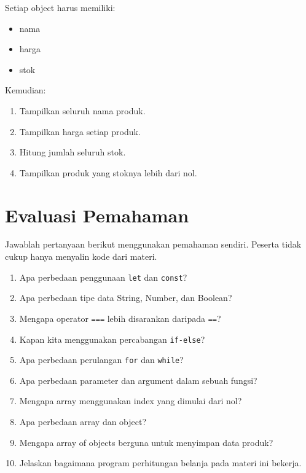 \documentclass[12pt,a4paper]{article}
\begin{document}
Setiap object harus memiliki:

\begin{itemize}
    \item nama
    \item harga
    \item stok
\end{itemize}

Kemudian:

\begin{enumerate}
    \item Tampilkan seluruh nama produk.
    \item Tampilkan harga setiap produk.
    \item Hitung jumlah seluruh stok.
    \item Tampilkan produk yang stoknya lebih dari nol.
\end{enumerate}

\section{Evaluasi Pemahaman}

Jawablah pertanyaan berikut menggunakan pemahaman
sendiri. Peserta tidak cukup hanya menyalin kode
dari materi.

\begin{enumerate}
    \item Apa perbedaan penggunaan \texttt{let}
    dan \texttt{const}?

    \item Apa perbedaan tipe data String, Number,
    dan Boolean?

    \item Mengapa operator \texttt{===} lebih
    disarankan daripada \texttt{==}?

    \item Kapan kita menggunakan percabangan
    \texttt{if-else}?

    \item Apa perbedaan perulangan \texttt{for}
    dan \texttt{while}?

    \item Apa perbedaan parameter dan argument
    dalam sebuah fungsi?

    \item Mengapa array menggunakan index yang
    dimulai dari nol?

    \item Apa perbedaan array dan object?

    \item Mengapa array of objects berguna untuk
    menyimpan data produk?

    \item Jelaskan bagaimana program perhitungan
    belanja pada materi ini bekerja.
\end{enumerate}
\end{document}
